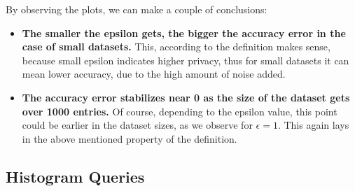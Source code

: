 By observing the plots, we can make a couple of conclusions:

\begin{itemize}
    \item \textbf{The smaller the epsilon gets, the bigger the accuracy error in the case of small datasets.} This, according to the definition makes sense, because small epsilon indicates higher privacy, thus for small datasets it can mean lower accuracy, due to the high amount of noise added.
    \item \textbf{The accuracy error stabilizes near 0 as the size of the dataset gets over 1000 entries.} Of course, depending to the epsilon value, this point could be earlier in the dataset sizes, as we observe for $\epsilon = 1$. This again lays in the above mentioned property of the definition.
\end{itemize}

\subsection{Histogram Queries}


